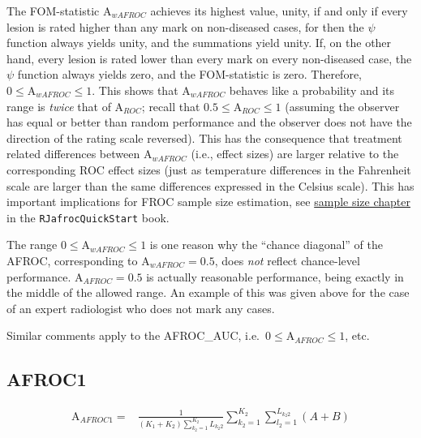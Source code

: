 \documentclass[
]{book}
\begin{document}
The FOM-statistic \(\text{A}_{wAFROC}\) achieves its highest value, unity, if and only if every lesion is rated higher than any mark on non-diseased cases, for then the \(\psi\) function always yields unity, and the summations yield unity. If, on the other hand, every lesion is rated lower than every mark on every non-diseased case, the \(\psi\) function always yields zero, and the FOM-statistic is zero. Therefore, \(0 \leq \text{A}_{wAFROC} \leq 1\). This shows that \(\text{A}_{wAFROC}\) behaves like a probability and its range is \emph{twice} that of \(\text{A}_{ROC}\); recall that \(0.5 \leq \text{A}_{ROC} \leq 1\) (assuming the observer has equal or better than random performance and the observer does not have the direction of the rating scale reversed). This has the consequence that treatment related differences between \(\text{A}_{wAFROC}\) (i.e., effect sizes) are larger relative to the corresponding ROC effect sizes (just as temperature differences in the Fahrenheit scale are larger than the same differences expressed in the Celsius scale). This has important implications for FROC sample size estimation, see \href{https://dpc10ster.github.io/RJafrocQuickStart/froc-sample-size.html}{sample size chapter} in the \texttt{RJafrocQuickStart} book.

The range \(0 \leq \text{A}_{wAFROC} \leq 1\) is one reason why the ``chance diagonal'' of the AFROC, corresponding to \(\text{A}_{wAFROC} = 0.5\), does \emph{not} reflect chance-level performance. \(\text{A}_{AFROC} = 0.5\) is actually reasonable performance, being exactly in the middle of the allowed range. An example of this was given above for the case of an expert radiologist who does not mark any cases.

Similar comments apply to the AFROC\_AUC, i.e.~\(0 \leq \text{A}_{AFROC} \leq 1\), etc.

\hypertarget{afroc1}{%
\subsection{AFROC1}\label{afroc1}}

\begin{equation}
\begin{aligned}
\text{A}_{AFROC1} =& \frac{1}{\left (K_1 +K_2 \right )\sum_{k_2=1}^{K_2}L_{k_2 2}}\sum_{k_2=1}^{K_2}\sum_{l_2=1}^{L_{k_2 2}} \left( A + B \right)
\end{aligned}
\label{eq:empirical-computational-afroc1}
\end{equation}
\end{document}
